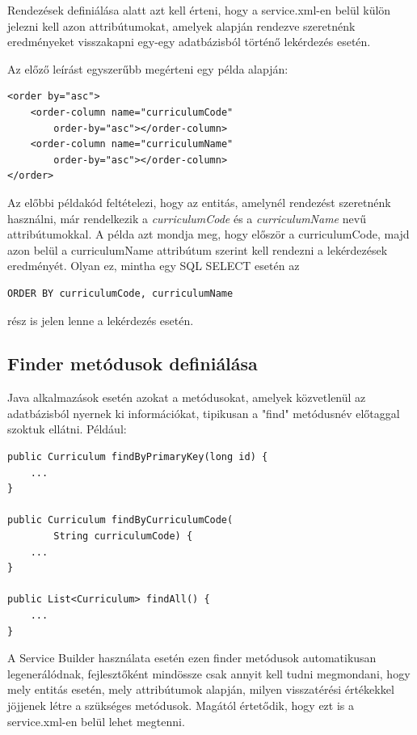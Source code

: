 \documentclass[hidelinks, 12pt, a4paper]{report}
\begin{document}
Rendezések definiálása alatt azt kell érteni, hogy a service.xml-en belül külön jelezni kell azon attribútumokat, amelyek alapján rendezve szeretnénk eredményeket visszakapni egy-egy adatbázisból történő lekérdezés esetén.

Az előző leírást egyszerűbb megérteni egy példa alapján:

\begin{minipage}{\linewidth}
\begin{lstlisting}
<order by="asc">
	<order-column name="curriculumCode"
		order-by="asc"></order-column>
	<order-column name="curriculumName"
		order-by="asc"></order-column>
</order>
\end{lstlisting}
\end{minipage}

Az előbbi példakód feltételezi, hogy az entitás, amelynél rendezést szeretnénk használni, már rendelkezik a \emph{curriculumCode} és a \emph{curriculumName} nevű attribútumokkal. A példa azt mondja meg, hogy először a curriculumCode, majd azon belül a curriculumName attribútum szerint kell rendezni a lekérdezések eredményét. Olyan ez, mintha egy SQL SELECT esetén az
\begin{lstlisting}
ORDER BY curriculumCode, curriculumName
\end{lstlisting}
rész is jelen lenne a lekérdezés esetén.

\subsection{Finder metódusok definiálása}

Java alkalmazások esetén azokat a metódusokat, amelyek közvetlenül az adatbázisból nyernek ki információkat, tipikusan a "find" metódusnév előtaggal szoktuk ellátni. Például:

\begin{minipage}{\linewidth}
\begin{lstlisting}
public Curriculum findByPrimaryKey(long id) {
	...
}

public Curriculum findByCurriculumCode(
		String curriculumCode) {
	...
}

public List<Curriculum> findAll() {
	...
}
\end{lstlisting}
\end{minipage}

A Service Builder használata esetén ezen finder metódusok automatikusan legenerálódnak, fejlesztőként mindössze csak annyit kell tudni megmondani, hogy mely entitás esetén, mely attribútumok alapján, milyen visszatérési értékekkel jöjjenek létre a szükséges metódusok. Magától értetődik, hogy ezt is a service.xml-en belül lehet megtenni.
\end{document}
